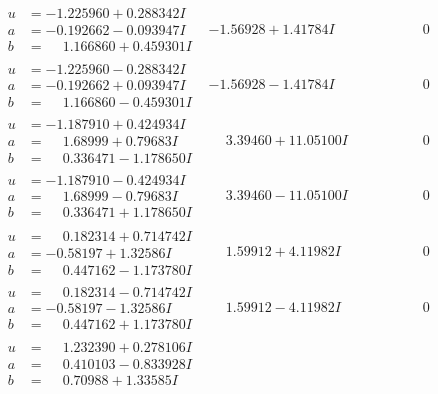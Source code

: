 \documentclass[1p]{elsarticle_modified}
\theoremstyle{definition}
\begin{document}
$$\begin{array}{c|c|c}
\begin{aligned}
u &= -1.225960 + 0.288342 I \\
a &= -0.192662 - 0.093947 I \\
b &= \phantom{-}1.166860 + 0.459301 I\end{aligned}
 & -1.56928 + 1.41784 I & \phantom{-0.000000 } 0 \\ \hline\begin{aligned}
u &= -1.225960 - 0.288342 I \\
a &= -0.192662 + 0.093947 I \\
b &= \phantom{-}1.166860 - 0.459301 I\end{aligned}
 & -1.56928 - 1.41784 I & \phantom{-0.000000 } 0 \\ \hline\begin{aligned}
u &= -1.187910 + 0.424934 I \\
a &= \phantom{-}1.68999 + 0.79683 I \\
b &= \phantom{-}0.336471 - 1.178650 I\end{aligned}
 & \phantom{-}3.39460 + 11.05100 I & \phantom{-0.000000 } 0 \\ \hline\begin{aligned}
u &= -1.187910 - 0.424934 I \\
a &= \phantom{-}1.68999 - 0.79683 I \\
b &= \phantom{-}0.336471 + 1.178650 I\end{aligned}
 & \phantom{-}3.39460 - 11.05100 I & \phantom{-0.000000 } 0 \\ \hline\begin{aligned}
u &= \phantom{-}0.182314 + 0.714742 I \\
a &= -0.58197 + 1.32586 I \\
b &= \phantom{-}0.447162 - 1.173780 I\end{aligned}
 & \phantom{-}1.59912 + 4.11982 I & \phantom{-0.000000 } 0 \\ \hline\begin{aligned}
u &= \phantom{-}0.182314 - 0.714742 I \\
a &= -0.58197 - 1.32586 I \\
b &= \phantom{-}0.447162 + 1.173780 I\end{aligned}
 & \phantom{-}1.59912 - 4.11982 I & \phantom{-0.000000 } 0 \\ \hline\begin{aligned}
u &= \phantom{-}1.232390 + 0.278106 I \\
a &= \phantom{-}0.410103 - 0.833928 I \\
b &= \phantom{-}0.70988 + 1.33585 I\end{aligned}

\end{array}$$
\end{document}
